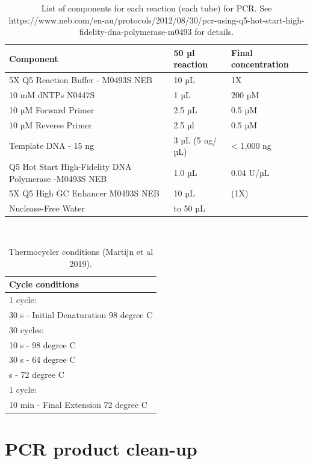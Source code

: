 \documentclass[
]{book}
\begin{document}
\begin{table}

\caption{\label{tab:table}List of components for each reaction (each tube) for PCR. See https://www.neb.com/en-au/protocols/2012/08/30/pcr-using-q5-hot-start-high-fidelity-dna-polymerase-m0493 for details.  }
\centering
\begin{tabular}[t]{lll}
\toprule
Component & 50 µl reaction & Final concentration\\
\midrule
5X Q5 Reaction Buffer - M0493S NEB & 10 µL & 1X\\
10 mM dNTPs N0447S & 1 µL & 200 µM\\
10 µM Forward Primer & 2.5 µL & 0.5 µM\\
10 µM Reverse Primer & 2.5 µl & 0.5 µM\\
Template DNA - 15 ng & 3 µL (5 ng/µL) & < 1,000 ng\\
\addlinespace
Q5 Hot Start High-Fidelity DNA Polymerase -M0493S NEB & 1.0 µL & 0.04 U/µL\\
5X Q5 High GC Enhancer M0493S NEB & 10 µL & (1X)\\
Nuclease-Free Water & to 50 µL & \\
\bottomrule
\end{tabular}
\end{table}

~

\begin{table}

\caption{\label{tab:table2}Thermocycler conditions (Martijn et al 2019).}
\centering
\begin{tabular}[t]{l}
\toprule
Cycle conditions\\
\midrule
1 cycle:\\
30 s - Initial Denaturation 98 degree C\\
30 cycles:\\
10 s - 98 degree C\\
30 s -  64 degree C\\
\addlinespace
210 s - 72 degree C\\
1 cycle:\\
10 min - Final Extension  72 degree C\\
\bottomrule
\end{tabular}
\end{table}

\hfill\break

\section{PCR product clean-up}\label{pcr-product-clean-up}
\end{document}
